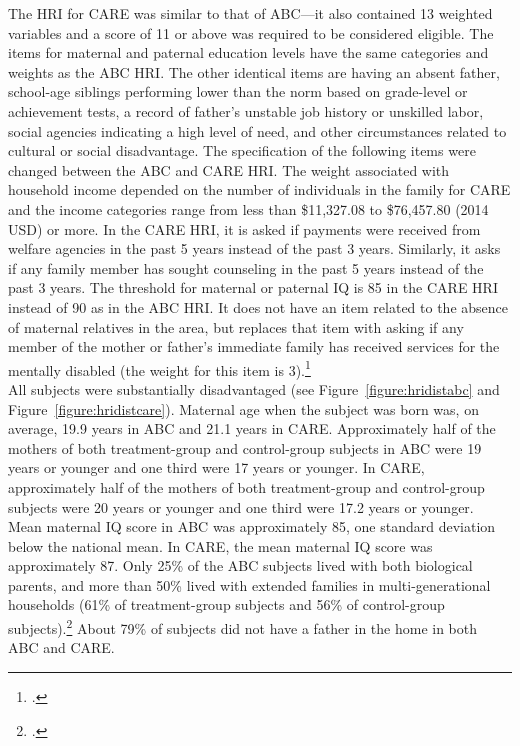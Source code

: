 \noindent The HRI for CARE was similar to that of ABC---it also contained 13 weighted variables and a score of 11 or above was required to be considered eligible. The items for maternal and paternal education levels have the same categories and weights as the ABC HRI. The other identical items are having an absent father,  school-age siblings performing lower than the norm based on grade-level or achievement tests, a record of father's unstable job history or unskilled labor, social agencies indicating a high level of need, and other circumstances related to cultural or social disadvantage. The specification of the following items were changed between the ABC and CARE HRI. The weight associated with household income depended on the number of individuals in the family for CARE and the income categories range from less than \$11,327.08 to \$76,457.80 (2014 USD) or more. In the CARE HRI, it is asked if payments were received from welfare agencies in the past 5 years instead of the past 3 years. Similarly, it asks if any family member has sought counseling in the past 5 years instead of the past 3 years. The threshold for maternal or paternal IQ is 85 in the CARE HRI instead of 90 as in the ABC HRI.  It does not have an item related to the absence of maternal relatives in the area, but replaces that item with asking if any member of the mother or father's immediate family has received services for the mentally disabled (the weight for this item is 3).\footnote{\citet{Ramey_etal_1985_Project-CARE_TiECSE}.} \\

\noindent All subjects were substantially disadvantaged (see Figure~\ref{figure:hridistabc} and Figure~\ref{figure:hridistcare}). Maternal age when the subject was born was, on average, 19.9 years in ABC and 21.1 years in CARE. Approximately half of the mothers of both treatment-group and control-group subjects in ABC were 19 years or younger and one third were 17 years or younger. In CARE, approximately half of the mothers of both treatment-group and control-group subjects were 20 years or younger and one third were 17.2 years or younger.  Mean maternal IQ score in ABC was approximately 85, one standard deviation below the national mean. In CARE, the mean maternal IQ score was approximately 87. Only 25\% of the ABC subjects lived with both biological parents, and more than 50\% lived with extended families in multi-generational households (61\% of treatment-group subjects and 56\% of control-group subjects).\footnote{\citet{Ramey_Campbell_1991_childreninpoverty,Campbell_Ramey_1994_CD}.} About 79\% of subjects did not have a father in the home in both ABC and CARE. \\

